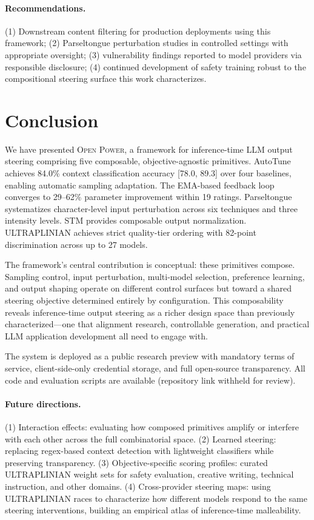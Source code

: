 \documentclass[11pt]{article}
\begin{document}
\paragraph{Recommendations.} (1) Downstream content filtering for production deployments using this framework; (2) Parseltongue perturbation studies in controlled settings with appropriate oversight; (3) vulnerability findings reported to model providers via responsible disclosure; (4) continued development of safety training robust to the compositional steering surface this work characterizes.

\section{Conclusion}

We have presented \textsc{Open Power}, a framework for inference-time LLM output steering comprising five composable, objective-agnostic primitives. AutoTune achieves 84.0\% context classification accuracy [78.0, 89.3] over four baselines, enabling automatic sampling adaptation. The EMA-based feedback loop converges to 29--62\% parameter improvement within 19 ratings. Parseltongue systematizes character-level input perturbation across six techniques and three intensity levels. STM provides composable output normalization. ULTRAPLINIAN achieves strict quality-tier ordering with 82-point discrimination across up to 27 models.

The framework's central contribution is conceptual: these primitives compose. Sampling control, input perturbation, multi-model selection, preference learning, and output shaping operate on different control surfaces but toward a shared steering objective determined entirely by configuration. This composability reveals inference-time output steering as a richer design space than previously characterized---one that alignment research, controllable generation, and practical LLM application development all need to engage with.

The system is deployed as a public research preview with mandatory terms of service, client-side-only credential storage, and full open-source transparency. All code and evaluation scripts are available (repository link withheld for review).

\paragraph{Future directions.} (1) Interaction effects: evaluating how composed primitives amplify or interfere with each other across the full combinatorial space. (2) Learned steering: replacing regex-based context detection with lightweight classifiers while preserving transparency. (3) Objective-specific scoring profiles: curated ULTRAPLINIAN weight sets for safety evaluation, creative writing, technical instruction, and other domains. (4) Cross-provider steering maps: using ULTRAPLINIAN races to characterize how different models respond to the same steering interventions, building an empirical atlas of inference-time malleability.
\end{document}
